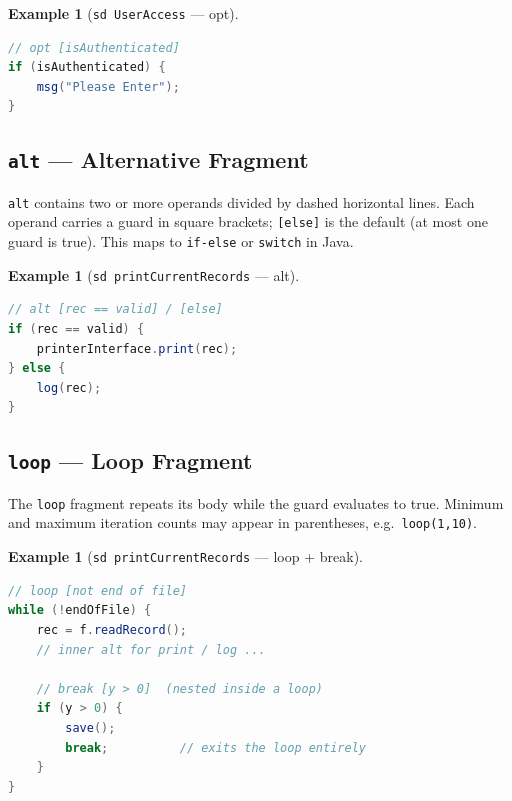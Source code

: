 \documentclass[11pt, a4paper, notitlepage]{report}
\theoremstyle{definition}
\theoremstyle{remark}
\theoremstyle{definition}
\newtheorem{example}[theorem]{Example}
\begin{document}
\begin{example}[\texttt{sd UserAccess} --- opt]
\label{ex:ch7-opt}
\begin{lstlisting}[language=Java, caption={opt translated to Java}]
// opt [isAuthenticated]
if (isAuthenticated) {
    msg("Please Enter");
}
\end{lstlisting}
\end{example}

\subsection{\texttt{alt} --- Alternative Fragment}
\label{subsec:ch7-alt}

\texttt{alt} contains two or more operands divided by dashed horizontal lines.
Each operand carries a guard in square brackets; \texttt{[else]} is the default
(at most one guard is true). This maps to \texttt{if-else} or \texttt{switch}
in Java.

\begin{example}[\texttt{sd printCurrentRecords} --- alt]
\label{ex:ch7-alt}
\begin{lstlisting}[language=Java, caption={alt translated to Java}]
// alt [rec == valid] / [else]
if (rec == valid) {
    printerInterface.print(rec);
} else {
    log(rec);
}
\end{lstlisting}
\end{example}

\subsection{\texttt{loop} --- Loop Fragment}
\label{subsec:ch7-loop}

The \texttt{loop} fragment repeats its body while the guard evaluates to true.
Minimum and maximum iteration counts may appear in parentheses, e.g.\
\texttt{loop(1,10)}.

\begin{example}[\texttt{sd printCurrentRecords} --- loop + break]
\label{ex:ch7-loop}
\begin{lstlisting}[language=Java, caption={loop with nested break translated to Java}]
// loop [not end of file]
while (!endOfFile) {
    rec = f.readRecord();
    // inner alt for print / log ...
    
    // break [y > 0]  (nested inside a loop)
    if (y > 0) {
        save();
        break;          // exits the loop entirely
    }
}
\end{lstlisting}
\end{example}
\end{document}
